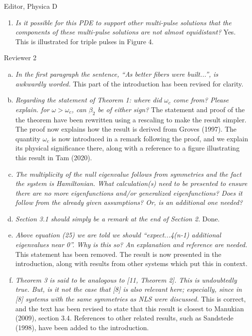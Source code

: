 \documentclass[11pt]{letter}
\begin{document}
\begin{letter}{Editor, Physica D}
\begin{enumerate}
\item \emph{Is it possible for this PDE to support other multi-pulse solutions that the components of these multi-pulse solutions are not almost equidistant?} Yes. This is illustrated for triple pulses in Figure 4.
\vspace{4mm}
\end{enumerate}

Reviewer 2
\begin{enumerate}[(a)]
\item \emph{In the first paragraph the sentence, ``As better fibers were built...'', is awkwardly worded.} This part of the introduction has been revised for clarity.
\vspace{4mm}

\item \emph{Regarding the statement of Theorem 1: where did $\omega_c$ come from? Please explain.
for $\omega > \omega_c$, can $\beta_2$ be of either sign?} The statement and proof of the the theorem have been rewritten using a rescaling to make the result simpler. The proof now explains how the result is derived from Groves (1997). The quantity $\omega_c$ is now introduced in a remark following the proof, and we explain its physical significance there, along with a reference to a figure illustrating this result in Tam (2020).
\vspace{4mm}

\item \emph{The multiplicity of the null eigenvalue follows from symmetries and the fact the system is Hamiltonian. What calculation(s) need to be presented to ensure there are no more eigenfunctions and/or generalized eigenfunctions? Does it follow from the already given assumptions? Or, is an additional one needed?}
\vspace{4mm}

\item \emph{Section 3.1 should simply be a remark at the end of Section 2.} Done.
\vspace{4mm}

\item \emph{Above equation (25) we are told we should ``expect...4(n-1) additional eigenvalues  near 0''. Why is this so? An explanation and reference are needed.} This statement has been removed. The result is now presented in the introduction, along with results from other systems which put this in context.
\vspace{4mm}

\item \emph{Theorem 3 is said to be analogous to [11, Theorem 2]. This is undoubtedly true. But, is it not the case that [8] is also relevant here; especially, since in [8] systems with the same symmetries as NLS were discussed.} This is correct, and the text has been revised to state that this result is closest to Manukian (2009), section 3.4. References to other related results, such as Sandstede (1998), have been added to the introduction.
\vspace{4mm}


\end{enumerate}
\end{letter}
\end{document}
